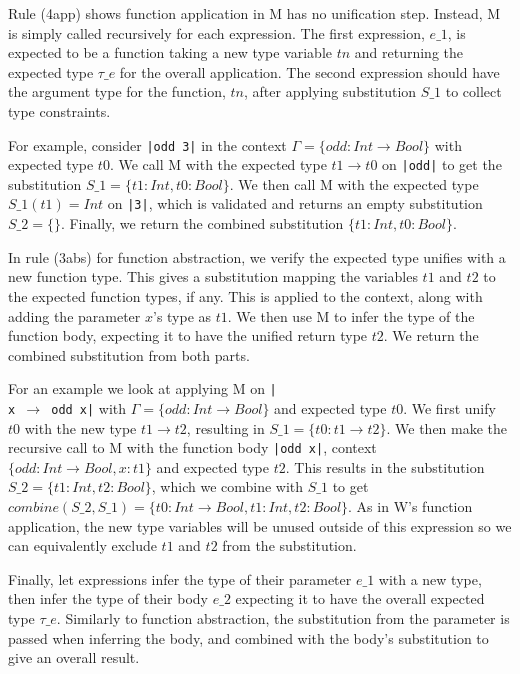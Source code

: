 \documentclass[a4paper,fleqn,twoside,12pt]{report}
\begin{document}
Rule (4app) shows function application in M has no unification step. Instead, M is simply called recursively for each expression. The first expression, $e\_1$, is expected to be a function taking a new type variable $tn$ and returning the expected type $\tau\_e$ for the overall application. The second expression should have the argument type for the function, $tn$, after applying substitution $S\_1$ to collect type constraints.

For example, consider \texttt{|odd 3|} in the context $\Gamma = \{ odd: Int \rightarrow Bool \}$ with expected type $t0$. We call M with the expected type $t1 \rightarrow t0$ on \texttt{|odd|} to get the substitution $S\_1 = \{ t1: Int, t0: Bool \}$. We then call M with the expected type $S\_1(t1) = Int$ on \texttt{|3|}, which is validated and returns an empty substitution $S\_2 = \{\}$. Finally, we return the combined substitution $\{ t1: Int, t0: Bool \}$.

In rule (3abs) for function abstraction, we verify the expected type unifies with a new function type. This gives a substitution mapping the variables $t1$ and $t2$ to the expected function types, if any. This is applied to the context, along with adding the parameter $x$’s type as $t1$. We then use M to infer the type of the function body, expecting it to have the unified return type $t2$. We return the combined substitution from both parts.

For an example we look at applying M on \texttt{|\\x $\rightarrow$ odd x|} with $\Gamma = \{ odd: Int \rightarrow Bool \}$ and expected type $t0$. We first unify $t0$ with the new type $t1 \rightarrow t2$, resulting in $S\_1 = \{ t0: t1 \rightarrow t2 \}$. We then make the recursive call to M with the function body \texttt{|odd x|}, context $\{ odd: Int \rightarrow Bool, x: t1 \}$ and expected type $t2$. This results in the substitution $S\_2 = \{ t1: Int, t2: Bool \}$, which we combine with $S\_1$ to get $combine(S\_2, S\_1) = \{ t0: Int \rightarrow Bool, t1: Int, t2: Bool \}$. As in W’s function application, the new type variables will be unused outside of this expression so we can equivalently exclude $t1$ and $t2$ from the substitution.

Finally, let expressions infer the type of their parameter $e\_1$ with a new type, then infer the type of their body $e\_2$ expecting it to have the overall expected type $\tau\_e$. Similarly to function abstraction, the substitution from the parameter is passed when inferring the body, and combined with the body’s substitution to give an overall result.
\end{document}

